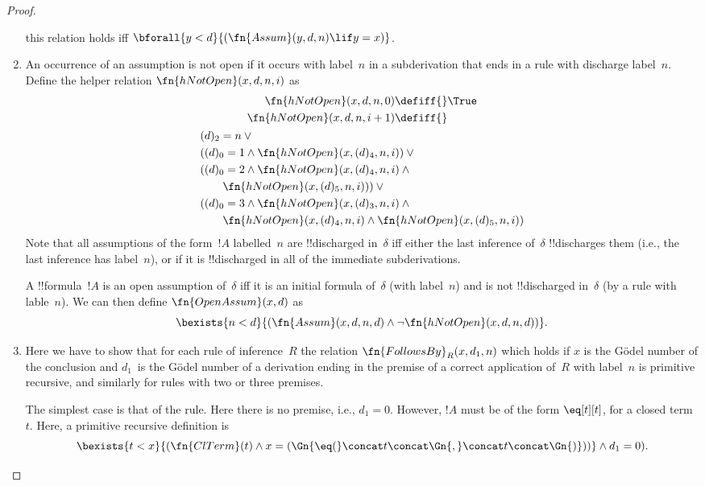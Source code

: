 \documentclass[../../../include/open-logic-section]{subfiles}
\begin{document}
\begin{proof}
\begin{enumerate}
  this relation holds iff $\bforall{y<d}{(\fn{Assum}(y, d, n) \lif y =
  x)}$.
\item An occurrence of an assumption is not open if it occurs
  with label~$n$ in a subderivation that ends in a rule with discharge
  label~$n$. Define the helper relation $\fn{hNotOpen}(x, d, n, i)$
  as
  \begin{multline*}
    \begin{aligned}
    \fn{hNotOpen}(x, d, n, 0) \defiff {} & \True\\   
    \fn{hNotOpen}(x, d, n, i+1) \defiff {} 
    \end{aligned}\\
    \begin{aligned}
      & (d)_2 = n \lor {}\\
      & ((d)_0 = 1 \land \fn{hNotOpen}(x, (d)_4, n, i)) \lor {}\\
      & ((d)_0 = 2 \land \fn{hNotOpen}(x, (d)_4, n, i) \land {}\\
      & \qquad\fn{hNotOpen}(x, (d)_5, n, i))) \lor {}\\
      & ((d)_0 = 3 \land \fn{hNotOpen}(x, (d)_3, n, i) \land {}\\
      & \qquad \fn{hNotOpen}(x, (d)_4, n, i) \land
      \fn{hNotOpen}(x, (d)_5, n, i))\\
    \end{aligned}
  \end{multline*}
  Note that all assumptions of the form~$!A$ labelled~$n$ are
  !!{discharged} in~$\delta$ iff either the last inference of~$\delta$
  !!{discharge}s them (i.e., the last inference has label~$n$), or if
  it is !!{discharged} in all of the immediate subderivations.

  A !!{formula}~$!A$ is an open assumption of~$\delta$ iff it is an
  initial formula of~$\delta$ (with label~$n$) and is not
  !!{discharged} in~$\delta$ (by a rule with lable~$n$). We can then
  define $\fn{OpenAssum}(x, d)$ as
  \[
  \bexists{n<d}{(\fn{Assum}(x,d,n,d)
  \land \lnot\fn{hNotOpen}(x, d, n, d))}.
  \]
\item Here we have to show that for each rule of inference~$R$ the
  relation $\fn{FollowsBy}_R(x, d_1, n)$ which holds if $x$ is the
  G\"odel number of the conclusion and $d_1$~is the G\"odel number of a
  derivation ending in the premise of a correct application of~$R$
  with label~$n$ is primitive recursive, and similarly for rules with
  two or three premises.

  The simplest case is that of the \Intro{\eq} rule. Here there is no
  premise, i.e., $d_1 = 0$.  However, $!A$ must be of the form
  $\eq[t][t]$, for a closed term~$t$. Here, a primitive recursive
  definition is
  \[
  \bexists{t<x}{(\fn{ClTerm}(t) \land x = 
    (\Gn{{\eq}(} \concat t \concat \Gn{,} \concat t \concat \Gn{)}))}
  \land d_1 = 0).
  \]


\end{enumerate}
\end{proof}
\end{document}
